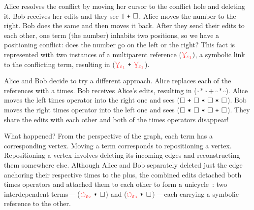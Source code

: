 \documentclass[nonacm, acmsmall, screen, review]{acmart}
\newcommand{\e}{\varepsilon}
\newcommand{\id}[1]{\textcolor{gray}{\ensuremath{#1}}}
\newcommand{\eid}[2]{{#2}^{\id{#1}}}
\newcommand{\hole}{\ensuremath{\square}} %
\newcommand{\ePlus}[3]{#2~\eid{#1}{\texttt{+}}~#3}
\newcommand{\eTimes}[3]{#2~\eid{#1}{\texttt{*}}~#3}
\newcommand{\multiVertex}[1]{\textcolor{red}{\ensuremath{\curlyveedownarrow_{#1}}}}
\newcommand{\cycleVertex}[1]{\textcolor{red}{\ensuremath{\circlearrowleft_{#1}}}}
\begin{document}

Alice resolves the conflict by moving her cursor to the conflict hole and deleting it.
Bob receives her edits and they see $\ePlus{}{1}{\hole}$.
Alice moves the number to the right.
Bob does the same and then moves it back.
After they send their edits to each other, one term (the number) inhabits two positions, so we have a positioning conflict:
does the number go on the left or the right?
This fact is represented with two instances of a multiparent reference ($\multiVertex{\e_1})$,
a symbolic link to the conflicting term,
resulting in ($\ePlus{}{\multiVertex{\e_1}}{\multiVertex{\e_1}}$).

Alice and Bob decide to try a different approach.
Alice replaces each of the references with a times.
Bob receives Alice's edits, resulting in ($\hole * \hole + \hole * \hole$).
Alice moves the left times operator into the right one and sees ($\ePlus{}{\hole}{\eTimes{}{\eTimes{}{\hole}{\hole}}{\hole}}$).
Bob moves the right times operator into the left one and sees ($\ePlus{}{\eTimes{}{\hole}{\eTimes{}{\hole}{\hole}}}{\hole}$).
They share the edits with each other and both of the times operators disappear!

What happened?
From the perspective of the graph, each term has a corresponding vertex.
Moving a term corresponds to repositioning a vertex.
Repositioning a vertex involves deleting its incoming edges and reconstructing them somewhere else.
Although Alice and Bob separately deleted just the edge anchoring their respective times to the plus,
the combined edits detached both times operators and attached them to each other to
form a unicycle~\cite{kruskal_efficient_1990}:
two interdependent terms---%
($\eTimes{}{\cycleVertex{\e_2}}{\hole}$) and ($\eTimes{}{\cycleVertex{\e_3}}{\hole}$)%
---each carrying a symbolic reference to the other.
\end{document}
